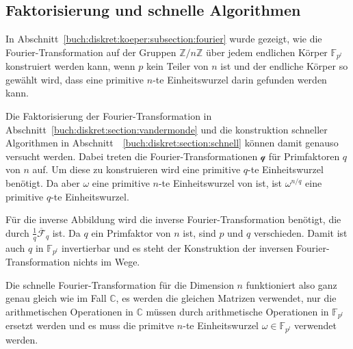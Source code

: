 %
%
\subsection{Faktorisierung und schnelle Algorithmen
\label{buch:diskret:koerper:subsection:faktorisierung}}
In Abschnitt~\ref{buch:diskret:koeper:subsection:fourier} wurde
gezeigt, wie die Fourier-Transformation auf der Gruppen
$\mathbb{Z}/n\mathbb{Z}$ über jedem endlichen Körper $\mathbb{F}_{p^l}$
konstruiert werden kann, wenn $p$ kein Teiler von $n$ ist und
der endliche Körper so gewählt wird, dass eine primitive $n$-te
Einheitswurzel darin gefunden werden kann.

Die Faktorisierung der Fourier-Transformation in
Abschnitt~\ref{buch:diskret:section:vandermonde}
und die konstruktion schneller Algorithmen in
Abschnitt~ \ref{buch:diskret:section:schnell} können damit
genauso versucht werden.
Dabei treten die Fourier-Transformationen $\mathscr{q}$ für Primfaktoren
$q$ von $n$ auf.
Um diese zu konstruieren wird eine primitive $q$-te Einheitswurzel benötigt.
Da aber $\omega$ eine primitive $n$-te Einheitswurzel von ist, ist
$\omega^{n/q}$ eine primitive $q$-te Einheitswurzel.

Für die inverse Abbildung wird die inverse Fourier-Transformation
benötigt, die durch $\frac{1}{q}\overline{\mathscr{F}}_q$ ist.
Da $q$ ein Primfaktor von $n$ ist, sind $p$ und $q$ verschieden.
Damit ist auch $q$ in $\mathbb{F}_{p^l}$ invertierbar und es steht
der Konstruktion der inversen Fourier-Transformation nichts im Wege.

Die schnelle Fourier-Transformation für die Dimension $n$ funktioniert
also ganz genau gleich wie im Fall $\mathbb{C}$, es werden die gleichen
Matrizen verwendet, nur die arithmetischen Operationen in $\mathbb{C}$
müssen durch arithmetische Operationen in $\mathbb{F}_{p^l}$ ersetzt
werden und es muss die primitve $n$-te Einheitswurzel
$\omega\in\mathbb{F}_{p^l}$ verwendet werden.


